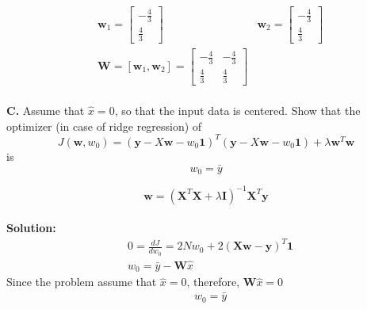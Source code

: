 \documentclass{article}
\begin{document}
\begin{equation}
\begin{aligned}
&\mathbf{w}_1  = \left[\begin{array}{c}  -\frac{4}{3} \\  \frac{4}{3} \end{array} \right]  
&\mathbf{w}_2 = \left[\begin{array}{c}  -\frac{4}{3} \\  \frac{4}{3} \end{array} \right]  \\
& \mathbf{W} = [\mathbf{w}_1, \mathbf{w}_2] =  \left[\begin{array}{cc}  -\frac{4}{3} & -\frac{4}{3} \\  \frac{4}{3} & \frac{4}{3} \end{array} \right]
\end{aligned}
\end{equation}
\\
\textbf{C. } Assume that $\hat{x} = 0$, so that the input data is centered. Show that the optimizer (in case of ridge regression) of 
\begin{equation}
    J(\mathbf{w},w_{0}) = (\mathbf{y} - X\mathbf{w} - w_{0} \mathbf{1})^{T}(\mathbf{y} - X\mathbf{w} - w_{0} \mathbf{1})+ \lambda \mathbf{w}^{T}\mathbf{w}
\end{equation}
is
\begin{equation}
    w_{0} = \bar{y}
\end{equation}

\begin{equation}
    \mathbf{w} = (\mathbf{X}^{T}\mathbf{X}+\lambda \mathbf{I})^{-1}\mathbf{X}^{T} \mathbf{y}
\end{equation}
\\
\textbf{Solution:}\\
\begin{equation}
\begin{aligned}
    & 0 = \frac{d J}{ d w_{0}} = 2N w_{0} + 2(\mathbf{X}\mathbf{w}-\mathbf{y})^{T}\mathbf{1} \\
    & w_{0} = \bar{y} - \mathbf{W}\hat{x}
\end{aligned}
\end{equation}
Since the problem assume that $\hat{x} = 0$, therefore, $\mathbf{W}\hat{x} = 0$
\begin{equation}
\begin{aligned}
& w_{0} = \bar{y}
\end{aligned}
\end{equation}
\end{document}
